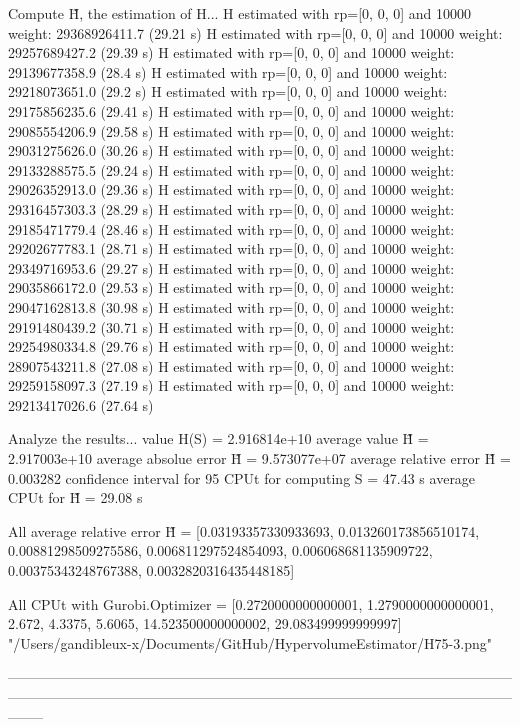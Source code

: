 Compute H̃, the estimation of H...
  H estimated with rp=[0, 0, 0] and 10000 weight:  29368926411.7  (29.21 s)
  H estimated with rp=[0, 0, 0] and 10000 weight:  29257689427.2  (29.39 s)
  H estimated with rp=[0, 0, 0] and 10000 weight:  29139677358.9  (28.4 s)
  H estimated with rp=[0, 0, 0] and 10000 weight:  29218073651.0  (29.2 s)
  H estimated with rp=[0, 0, 0] and 10000 weight:  29175856235.6  (29.41 s)
  H estimated with rp=[0, 0, 0] and 10000 weight:  29085554206.9  (29.58 s)
  H estimated with rp=[0, 0, 0] and 10000 weight:  29031275626.0  (30.26 s)
  H estimated with rp=[0, 0, 0] and 10000 weight:  29133288575.5  (29.24 s)
  H estimated with rp=[0, 0, 0] and 10000 weight:  29026352913.0  (29.36 s)
  H estimated with rp=[0, 0, 0] and 10000 weight:  29316457303.3  (28.29 s)
  H estimated with rp=[0, 0, 0] and 10000 weight:  29185471779.4  (28.46 s)
  H estimated with rp=[0, 0, 0] and 10000 weight:  29202677783.1  (28.71 s)
  H estimated with rp=[0, 0, 0] and 10000 weight:  29349716953.6  (29.27 s)
  H estimated with rp=[0, 0, 0] and 10000 weight:  29035866172.0  (29.53 s)
  H estimated with rp=[0, 0, 0] and 10000 weight:  29047162813.8  (30.98 s)
  H estimated with rp=[0, 0, 0] and 10000 weight:  29191480439.2  (30.71 s)
  H estimated with rp=[0, 0, 0] and 10000 weight:  29254980334.8  (29.76 s)
  H estimated with rp=[0, 0, 0] and 10000 weight:  28907543211.8  (27.08 s)
  H estimated with rp=[0, 0, 0] and 10000 weight:  29259158097.3  (27.19 s)
  H estimated with rp=[0, 0, 0] and 10000 weight:  29213417026.6  (27.64 s)

Analyze the results...
  value H(S)                  = 2.916814e+10 
  average value H̃             = 2.917003e+10 
  average absolue error H̃     = 9.573077e+07 
  average relative error H̃    = 0.003282 
  confidence interval for 95%
  CPUt for computing S         = 47.43 s
  average CPUt for H̃           = 29.08 s

All average relative error H̃ = [0.03193357330933693, 0.013260173856510174, 0.00881298509275586, 0.006811297524854093, 0.006068681135909722, 0.00375343248767388, 0.0032820316435448185]

All CPUt with Gurobi.Optimizer = [0.2720000000000001, 1.2790000000000001, 2.672, 4.3375, 5.6065, 14.523500000000002, 29.083499999999997]
"/Users/gandibleux-x/Documents/GitHub/HypervolumeEstimator/H75-3.png"

--------------------------------------------------------------------------------------------------------------------------------------------------------------------------------------------------------------------------------

